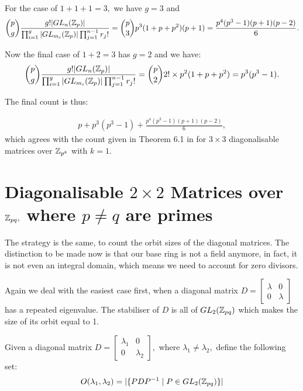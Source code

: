 \documentclass[11pt, titlepage, a4paper]{article}
\begin{document}
For the case of  $1+1+1=3,$ we have $g=3$ and 
\begin{align*}
 \binom{p}{g} \frac{g! |GL_{n}(\mathbb{Z}_{p})|}{\prod_{i=1}^{g} |GL_{m_{i}}(\mathbb{Z}_{p})| \prod_{j=1}^{n-1} r_{j}!}= \binom{p}{3} p^{3}(1+p+p^{2})(p+1) = \frac{p^{4}(p^{3}-1)(p+1)(p-2)}{6}.
\end{align*}

Now the final case of $1+2=3$ has $g=2$ and we have:
 \begin{align*}
 \binom{p}{g} \frac{g! |GL_{n}(\mathbb{Z}_{p})|}{\prod_{i=1}^{g} |GL_{m_{i}}(\mathbb{Z}_{p})| \prod_{j=1}^{n-1} r_{j}!}= \binom{p}{2} 2! \times p^{2}(1+p+p^{2}) = p^{3}(p^{3}-1).
\end{align*}
 
 The final count is thus:
 
\begin{align*}
 p + p^{3}(p^{3}-1) + \frac{p^{4}(p^{3}-1)(p+1)(p-2)}{6},
\end{align*}
which agrees with the count given in Theorem 6.1 in \cite{zpk} for $3\times 3$ diagonalisable matrices over $\mathbb{Z}_{p^{k}}$ with $k=1.$

\section{Diagonalisable $2\times 2$ Matrices over $\mathbb{Z}_{pq},$ where $p\neq q$ are primes}

The strategy is the same, to count the orbit sizes of the diagonal matrices. The distinction to be made now is that our base ring is not a field anymore, in fact, it is not even an integral domain, which means we need to account for zero divisors.

Again we deal with the easiest case first, when a diagonal matrix $D = 
\begin{bmatrix}
 \lambda & 0 \\
 0 & \lambda
\end{bmatrix} 
$ has a repeated eigenvalue. The stabiliser of $D$ is all of $GL_{2}(\mathbb{Z}_{pq})$ which makes the size of its orbit equal to 1.

Given a diagonal matrix $D = 
\begin{bmatrix}
 \lambda_{1} & 0 \\
 0 & \lambda_{2}
\end{bmatrix},
$ where $\lambda_{1} \neq \lambda_{2},$ define the following set:
\begin{align*}
 O(\lambda_{1},\lambda_{2}) = |\{PDP^{-1} \mid P \in GL_{2}(\mathbb{Z}_{pq})\}|
\end{align*}
\end{document}
